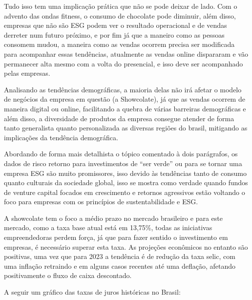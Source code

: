 \documentclass[
	12pt,				%
	openright,			%
	oneside,			%
	a4paper,			%
	english,			%
	french,				%
	spanish,			%
	brazil				%
	]{abntex2}
\begin{document}
	Tudo isso tem uma implicação prática que não se pode deixar de lado. Com o advento das ondas fitness, o consumo de chocolate pode diminuir, além disso, empresas que não são ESG podem ver o resultado operacional e de vendas derreter num futuro próximo, e por fim já que a maneiro como as pessoas consomem mudou, a maneira como as vendas ocorrem precisa ser modificada para acompanhar essas tendências, atualmente as vendas online dispararam e vão permanecer alta mesmo com a volta do presencial, e isso deve ser acompanhado pelas empresas.
	
	Analisando as tendências demográficas, a maioria delas não irá afetar o modelo de negócios da empresa em questão (a Showcolate), já que as vendas ocorrem de maneira digital ou online, facilitando a quebra de várias barreiras demográficas e além disso, a diversidade de produtos da empresa consegue atender de forma tanto generalista quanto personalizada as diversas regiões do brasil, mitigando as implicações da tendência demográfica.
	
	Abordando de forma mais detalhista o tópico comentado à dois parágrafos, os dados de risco retorno para investimentos de “ser verde” ou para se tornar uma empresa ESG são muito promissores, isso devido às tendências tanto de consumo quanto culturais da sociedade global, isso se mostra como verdade quando fundos de venture capital focados em crescimento e retornos agressivos estão voltando o foco para empresas com os princípios de sustentabilidade e ESG.

A showcolate tem o foco a médio prazo no mercado brasileiro e para este mercado, como a taxa base atual está em 13,75$\%$, todas as iniciativas empreendedoras perdem força, já que para fazer sentido o investimento em empresas, é necessário superar esta taxa. As projeções econômicos no entanto são positivas, uma vez que para 2023 a tendência é de redução da taxa selic, com uma inflação retraindo e em alguns casos recentes até uma deflação, afetando positivamente o fluxo de caixa descontado.
	
	A seguir um gráfico das taxas de juros históricas no Brasil:
\end{document}
